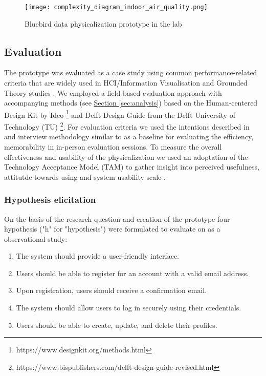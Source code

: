 \begin{figure}[!h]
    \centering
    \texttt{[image: complexity\_diagram\_indoor\_air\_quality.png]}
    \caption{Bluebird data physicalization prototype in the lab}
    \label{fig:complexity}
\end{figure}

\subsection{Evaluation}

The prototype was evaluated as a case study using common performance-related criteria that are widely used in HCI/Information Visualisation \cite{ranasinghe_encoding_2023} and Grounded Theory studies \cite{chun_tie_grounded_2019}. We employed a field-based evaluation approach with accompanying methods (see \hyperref[sec:analysis]{Section \ref*{sec:analysis}}) based on the Human-centered Design Kit by Ideo \footnote{https://www.designkit.org/methods.html} and Delft Design Guide from the Delft University of Technology (TU) \footnote{https://www.bispublishers.com/delft-design-guide-revised.html}. For evaluation criteria we used the intentions described in \cite{ranasinghe_encoding_2023} and interview methodology similar to \cite{jansen_evaluating_2013} as a baseline for evaluating the efficiency, memorability in in-person evaluation sessions. To measure the overall effectiveness and usability of the physicalization we used an adoptation of the Technology Acceptance Model (TAM) to gather insight into perceived usefulness, attitutde towards using and system usability scale \cite{}. 

\subsubsection{Hypothesis elicitation}

On the basis of the research question and creation of the prototype four hypothesis ("h" for "hypothesis") were formulated to evaluate on as a observational study:

\begin{enumerate}
    \renewcommand{\labelenumi}{H\arabic{enumi}:}
    \item The system should provide a user-friendly interface.
    \item Users should be able to register for an account with a valid email address.
    \item Upon registration, users should receive a confirmation email.
    \item The system should allow users to log in securely using their credentials.
    \item Users should be able to create, update, and delete their profiles.
\end{enumerate}

